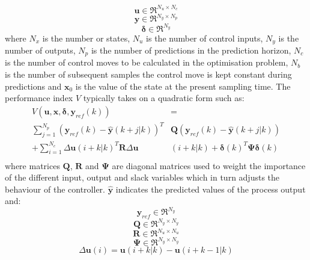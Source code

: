 \documentclass[preprint,authoryear,12pt]{elsarticle}
\begin{document}
\begin{displaymath}
\mathbf{u}\in \Re^{N_u \times N_c}
\end{displaymath}
\begin{displaymath}
\mathbf{y}\in \Re^{N_y \times N_p}
\end{displaymath}
\begin{displaymath}
\boldsymbol{\delta}\in \Re^{N_y}
\end{displaymath}
where $N_x$ is the number or states, $N_u$ is the number of control inputs, $N_y$ is the number of outputs, $N_p$ is the number of predictions in the prediction horizon, $N_c$ is the number of control moves to be calculated in the optimisation problem, $N_b$ is the number of subsequent samples the control move is kept constant during predictions and $\mathbf{x}_0$ is the value of the state at the present sampling time. The performance index $V$ typically takes on a quadratic form such as:
\begin{equation}
\label{eq:MPC problem}
\begin{split}
V(\mathbf{u},\mathbf{x},\boldsymbol{\delta},\mathbf{y}_{ref}(k))&=\\
\sum_{j=1}^{N_p}(\mathbf{y}_{ref}(k)-\hat{\mathbf{y}}(k+j|k))^{T}&\mathbf{Q}(\mathbf{y}_{ref}(k)-\hat{\mathbf{y}}(k+j|k))\\+\sum_{i=1}^{N_c}\Delta \mathbf{u}(i+k|k)^{T}\mathbf{R}\Delta \mathbf{u}&(i+k|k)
+\boldsymbol{\delta}(k)^T \boldsymbol{\Psi} \boldsymbol{\delta}(k)\\
\end{split}
\end{equation}
where matrices $\mathbf{Q}$, $\mathbf{R}$ and $\boldsymbol{\Psi}$ are diagonal matrices used to weight the importance of the different input, output and slack variables which in turn adjusts the behaviour of the controller. $\hat{\mathbf{y}}$ indicates the predicted values of the process output and: 
\begin{displaymath}
\mathbf{y}_{ref} \in \Re^{N_y}
\end{displaymath}
\begin{displaymath}
\mathbf{Q}\in \Re^{N_y \times N_y}
\end{displaymath}
\begin{displaymath}
\mathbf{R} \in \Re^{N_u \times N_u}
\end{displaymath}
\begin{displaymath}
\boldsymbol{\Psi}\in \Re^{N_y \times N_y}
\end{displaymath}
\begin{displaymath}
\Delta \mathbf{u}(i) = \mathbf{u}(i+k|k) - \mathbf{u}(i+k-1|k)
\end{displaymath}
\end{document}
